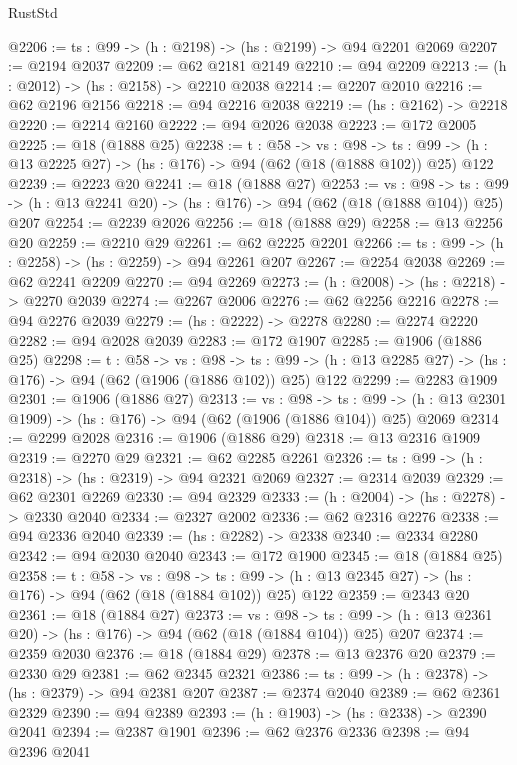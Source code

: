 \begin{lexlean}{RustStd}
\begin{coremodule}
{\begin{coremodule}
{{{{{{{{{{{@2206 := {ts : @99} -> (h : @2198) -> (hs : @2199) -> @94 @2201 @2069
@2207 := @2194 @2037
@2209 := @62 @2181 @2149
@2210 := @94 @2209
@2213 := (h : @2012) -> (hs : @2158) -> @2210 @2038
@2214 := @2207 @2010
@2216 := @62 @2196 @2156
@2218 := @94 @2216 @2038
@2219 := (hs : @2162) -> @2218
@2220 := @2214 @2160
@2222 := @94 @2026 @2038
@2223 := @172 @2005
@2225 := @18 (@1888 @25)
@2238 := {t : @58} ->
  {vs : @98} ->
  {ts : @99} -> (h : @13 @2225 @27) -> (hs : @176) -> @94 (@62 (@18 (@1888 @102)) @25) @122
@2239 := @2223 @20
@2241 := @18 (@1888 @27)
@2253 := {vs : @98} ->
  {ts : @99} -> (h : @13 @2241 @20) -> (hs : @176) -> @94 (@62 (@18 (@1888 @104)) @25) @207
@2254 := @2239 @2026
@2256 := @18 (@1888 @29)
@2258 := @13 @2256 @20
@2259 := @2210 @29
@2261 := @62 @2225 @2201
@2266 := {ts : @99} -> (h : @2258) -> (hs : @2259) -> @94 @2261 @207
@2267 := @2254 @2038
@2269 := @62 @2241 @2209
@2270 := @94 @2269
@2273 := (h : @2008) -> (hs : @2218) -> @2270 @2039
@2274 := @2267 @2006
@2276 := @62 @2256 @2216
@2278 := @94 @2276 @2039
@2279 := (hs : @2222) -> @2278
@2280 := @2274 @2220
@2282 := @94 @2028 @2039
@2283 := @172 @1907
@2285 := @1906 (@1886 @25)
@2298 := {t : @58} ->
  {vs : @98} ->
  {ts : @99} -> (h : @13 @2285 @27) -> (hs : @176) -> @94 (@62 (@1906 (@1886 @102)) @25) @122
@2299 := @2283 @1909
@2301 := @1906 (@1886 @27)
@2313 := {vs : @98} ->
  {ts : @99} -> (h : @13 @2301 @1909) -> (hs : @176) -> @94 (@62 (@1906 (@1886 @104)) @25) @2069
@2314 := @2299 @2028
@2316 := @1906 (@1886 @29)
@2318 := @13 @2316 @1909
@2319 := @2270 @29
@2321 := @62 @2285 @2261
@2326 := {ts : @99} -> (h : @2318) -> (hs : @2319) -> @94 @2321 @2069
@2327 := @2314 @2039
@2329 := @62 @2301 @2269
@2330 := @94 @2329
@2333 := (h : @2004) -> (hs : @2278) -> @2330 @2040
@2334 := @2327 @2002
@2336 := @62 @2316 @2276
@2338 := @94 @2336 @2040
@2339 := (hs : @2282) -> @2338
@2340 := @2334 @2280
@2342 := @94 @2030 @2040
@2343 := @172 @1900
@2345 := @18 (@1884 @25)
@2358 := {t : @58} ->
  {vs : @98} ->
  {ts : @99} -> (h : @13 @2345 @27) -> (hs : @176) -> @94 (@62 (@18 (@1884 @102)) @25) @122
@2359 := @2343 @20
@2361 := @18 (@1884 @27)
@2373 := {vs : @98} ->
  {ts : @99} -> (h : @13 @2361 @20) -> (hs : @176) -> @94 (@62 (@18 (@1884 @104)) @25) @207
@2374 := @2359 @2030
@2376 := @18 (@1884 @29)
@2378 := @13 @2376 @20
@2379 := @2330 @29
@2381 := @62 @2345 @2321
@2386 := {ts : @99} -> (h : @2378) -> (hs : @2379) -> @94 @2381 @207
@2387 := @2374 @2040
@2389 := @62 @2361 @2329
@2390 := @94 @2389
@2393 := (h : @1903) -> (hs : @2338) -> @2390 @2041
@2394 := @2387 @1901
@2396 := @62 @2376 @2336
@2398 := @94 @2396 @2041
}}}}}}}}}}}
\end{coremodule}}
\end{coremodule}
\end{lexlean}
